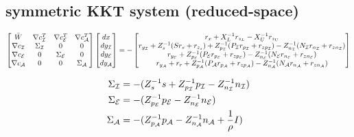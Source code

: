 \documentclass[10pt]{article}
\begin{document}
		\subsection*{symmetric KKT system (reduced-space)}
	\begin{equation}
		\begin{aligned}
		\begin{bmatrix}
		\bar{W} & \nabla c_{\mathcal I}^T & \nabla c_{\mathcal E}^T & \nabla c_{\mathcal A}^T \\
		\nabla c_{\mathcal I} & \Sigma_{\mathcal I} & 0 & 0 \\
		\nabla c_{\mathcal E} & 0 & \Sigma_{\mathcal E} & 0 \\
		\nabla c_{\mathcal A} & 0 & 0 & \Sigma_{\mathcal A} \\
		\end{bmatrix}
		\begin{bmatrix}
		dx \\
		dy_{\mathcal I} \\
		dy_{\mathcal E} \\
		dy_{\mathcal A} \\
		\end{bmatrix}
		=
		-\begin{bmatrix}
		r_x + X_L^{-1}r_{z_L} - X_U^{-1} r_{z_U}\\
		r_{y_{\mathcal I}} + Z_s^{-1}(Sr_s + r_{z_s}) + Z_{p_{\mathcal I}}^{-1}(P_{\mathcal I}r_{p_{\mathcal I}} + r_{zp_{\mathcal I}}) - Z_{n_{\mathcal I}}^{-1}(N_{\mathcal I}r_{n_{\mathcal I}} + r_{zn_{\mathcal I}})\\
		r_{y_{\mathcal E}} + Z_{p_{\mathcal E}}^{-1}(P_{\mathcal E}r_{p_{\mathcal E}} + r_{zp_{\mathcal E}}) - Z_{n_{\mathcal E}}^{-1}(N_{\mathcal E}r_{n_{\mathcal E}} + r_{zn_{\mathcal E}})\\
		r_{y_{\mathcal A}} + r_r + Z_{p_{\mathcal A}}^{-1}(P_{\mathcal A}r_{p_{\mathcal A}} + r_{zp_{\mathcal A}}) - Z_{n_{\mathcal A}}^{-1}(N_{\mathcal A}r_{n_{\mathcal A}} + r_{zn_{\mathcal A}})\\
		\end{bmatrix}
		\end{aligned} \notag
	\end{equation}
	
	\begin{equation}
		\begin{aligned}
		\Sigma_{\mathcal I} &= -(Z_s^{-1} s + Z_{p_{\mathcal I}}^{-1} p_{\mathcal I} - Z_{n_{\mathcal I}}^{-1} n_{\mathcal I})\\
		\Sigma_{\mathcal E} &= -(Z_{p_{\mathcal E}}^{-1} p_{\mathcal E} - Z_{n_{\mathcal E}}^{-1} n_{\mathcal E})\\
		\Sigma_{\mathcal A} &= -(Z_{p_{\mathcal A}}^{-1} p_{\mathcal A} - Z_{n_{\mathcal A}}^{-1} n_{\mathcal A} + \frac{1}{\rho}I)\\ \notag
		\end{aligned}
	\end{equation}
	
\end{document}
